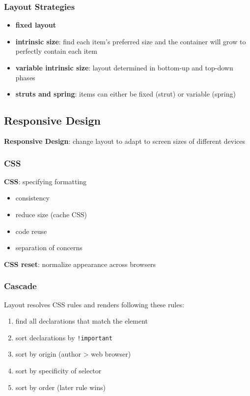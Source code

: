\documentclass[]{article}
\theoremstyle{definition}
\begin{document}
			\subsubsection{Layout Strategies}
				\begin{itemize}
					\item \textbf{fixed layout}
					\item \textbf{intrinsic size}:	find each item's preferred size and the container will grow to perfectly contain each item
					\item \textbf{variable intrinsic size}:	layout determined in bottom-up and top-down phases
					\item \textbf{struts and spring}:	items can either be fixed (strut) or variable (spring)
				\end{itemize}
		\subsection{Responsive Design}
			\textbf{Responsive Design}: change layout to adapt to screen sizes of different devices
			\subsubsection{CSS}
				\textbf{CSS}:	specifying formatting
				\begin{itemize}
					\item consistency
					\item reduce size (cache CSS)
					\item code reuse
					\item separation of concerns
				\end{itemize}
				\textbf{CSS reset}:	normalize appearance across browsers
			\subsubsection{Cascade}
				Layout resolves CSS rules and renders following these rules:
				\begin{enumerate}
					\item find all declarations that match the element
					\item sort declarations by \lstinline|!important|
					\item sort by origin (author > web browser)
					\item sort by specificity of selector
					\item sort by order (later rule wins)
				\end{enumerate}
						
			
\end{document}

